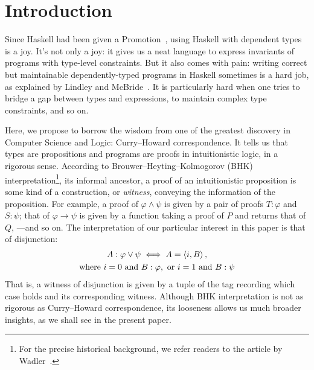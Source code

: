 \documentclass[demotion-paper.tex]{subfiles}
\begin{document}
\section{Introduction}
Since Haskell had been given a Promotion~\cite{Yorgey:2012}, using Haskell with dependent types is a joy.
It's not only a joy: it gives us a neat language to express invariants of programs with type-level constraints.
But it also comes with pain: writing correct but maintainable dependently-typed programs in Haskell sometimes is a hard job, as explained by Lindley and McBride~\cite{10.1145/2503778.2503786}.
It is particularly hard when one tries to bridge a gap between types and expressions, to maintain complex type constraints, and so on.

Here, we propose to borrow the wisdom from one of the greatest discovery in Computer Science and Logic: Curry--Howard correspondence.
It tells us that types are propositions and programs are proofs in intuitionistic logic, in a rigorous sense.
According to Brouwer--Heyting--Kolmogorov (BHK) interpretation\footnote{For the precise historical background, we refer readers to the article by Wadler~\cite{Wadler:2015aa}.}, its informal ancestor, a proof of an intuitionistic proposition is some kind of a construction, or \emph{witness}, conveying the information of the proposition.
For example, a proof of $\varphi \land \psi$ is given by a pair of proofs $T: \varphi$ and $S: \psi$; that of $\varphi \to \psi$ is given by a function taking a proof of $P$ and returns that of $Q$, ---and so on.
The interpretation of our particular interest in this paper is that of disjunction:
\begin{gather*}
  A: \varphi \vee \psi \iff A = \braket{i, B},
\\
\text{where }
i = 0 \text{ and } B: \varphi, \text{ or }
i = 1 \text{ and } B: \psi
\end{gather*}
That is, a witness of disjunction is given by a tuple of the tag recording which case holds and its corresponding witness.
Although BHK interpretation is not as rigorous as Curry--Howard correspondence, its looseness allows us much broader insights, as we shall see in the present paper.
\end{document}
